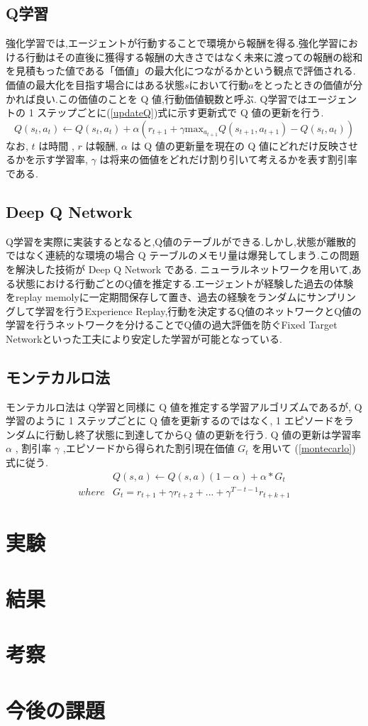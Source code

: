 \documentclass[twocolumn]{jarticle}     %
\begin{document}
\subsection{Q学習}
強化学習では,エージェントが行動することで環境から報酬を得る.強化学習における行動はその直後に獲得する報酬の大きさではなく未来に渡っての報酬の総和を見積もった値である「価値」の最大化につながるかという観点で評価される.
価値の最大化を目指す場合にはある状態$s$において行動$a$をとったときの価値が分かれば良い.この価値のことを Q 値,行動価値観数と呼ぶ.
Q学習ではエージェントの 1 ステップごとに(\ref{updateQ})式に示す更新式で Q 値の更新を行う.
\begin{equation}
  \label{updateQ}
  Q(s_t,a_t) \leftarrow  Q(s_t,a_t) + \alpha(r_{t+1} + \gamma \mathrm{max}_{a_{t+1}}Q(s_{t+1},a_{t+1}) - Q(s_t,a_t))
\end{equation}
なお, $t$ は時間 , $r$ は報酬, $\alpha$ は Q 値の更新量を現在の Q 値にどれだけ反映させるかを示す学習率, $\gamma$ は将来の価値をどれだけ割り引いて考えるかを表す割引率である\cite{緑本}.

\subsection{Deep Q Network}
Q学習を実際に実装するとなると,Q値のテーブルができる.しかし,状態が離散的ではなく連続的な環境の場合 Q テーブルのメモリ量は爆発してしまう.この問題を解決した技術が Deep Q Network である.
ニューラルネットワークを用いて,ある状態における行動ごとのQ値を推定する.エージェントが経験した過去の体験をreplay memolyに一定期間保存して置き、過去の経験をランダムにサンプリングして学習を行うExperience Replay,行動を決定するQ値のネットワークとQ値の学習を行うネットワークを分けることでQ値の過大評価を防ぐFixed Target Networkといった工夫により安定した学習が可能となっている\cite{DQN}.

\subsection{モンテカルロ法}
モンテカルロ法は Q学習と同様に Q 値を推定する学習アルゴリズムであるが, Q 学習のように 1 ステップごとに Q 値を更新するのではなく, 1 エピソードをランダムに行動し終了状態に到達してからQ 値の更新を行う. Q 値の更新は学習率 $\alpha$ , 割引率 $\gamma$ ,エピソードから得られた割引現在価値 $G_t$ を用いて (\ref{montecarlo}) 式に従う\cite{緑本}.
\begin{eqnarray}
  \label{montecarlo}
  &Q(s,a) \leftarrow Q(s,a)(1 - \alpha) + \alpha * G_{t} \\
  where  &G_t = r_{t+1} + \gamma r_{t+2} + ... + \gamma^{T-t-1} r_{t+k+1} 
\end{eqnarray}


\section{実験}


\section{結果}
\section{考察}
\section{今後の課題}




\end{document}
